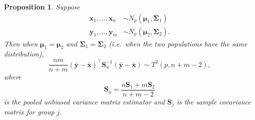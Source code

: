 \documentclass[]{book}
\newtheorem{proposition}{Proposition}[chapter]
\theoremstyle{definition}
\theoremstyle{definition}
\theoremstyle{definition}
\theoremstyle{remark}
\begin{document}
\begin{proposition}
\protect\hypertarget{prp:seven1}{}{\label{prp:seven1} }Suppose
\begin{align*}
\boldsymbol x_1,\ldots,\boldsymbol x_n  &\sim N_p(\boldsymbol \mu_1,\boldsymbol \Sigma_1)\\ 
\boldsymbol y_1,\ldots,\boldsymbol y_m  &\sim N_p(\boldsymbol \mu_2,\boldsymbol \Sigma_2). 
\end{align*}
Then when \(\boldsymbol \mu_1 = \boldsymbol \mu_2\) and \(\boldsymbol \Sigma_1 = \boldsymbol \Sigma_2\) (i.e.~when the two populations have the same distribution),
\[\frac{nm}{n+m} (\bar{\boldsymbol y} - \bar{\boldsymbol x})^\top \boldsymbol S_u^{-1} (\bar{\boldsymbol y} - \bar{\boldsymbol x}) \sim T^2(p,n+m-2),\]
where
\[\boldsymbol S_u = \frac{n\boldsymbol S_1 + m\boldsymbol S_2}{n+m-2}\]
is the pooled unbiased variance matrix estimator
and \(\boldsymbol S_j\) is the sample covariance matrix for group \(j\).
\end{proposition}
\end{document}
